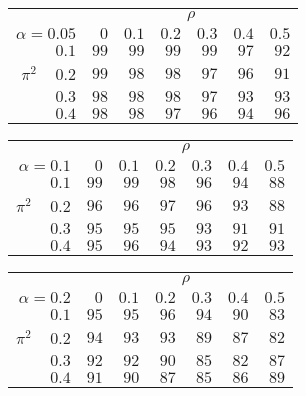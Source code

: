 \begin{tabular}{r|rrrrrr}
\hline\hline
 &\multicolumn{6}{c}{$\rho$} \\ 
 $\alpha = 0.05$ & $0$ & $0.1$ & $0.2$ & $0.3$ & $0.4$ & $0.5$ \\ 
 \hline$0.1$ & $99$ & $99$ & $99$ & $99$ & $97$ & $92$\\ 
$\pi^2\;\;\;$ $0.2$ & $99$ & $98$ & $98$ & $97$ & $96$ & $91$\\ 
$0.3$ & $98$ & $98$ & $98$ & $97$ & $93$ & $93$\\ 
$0.4$ & $98$ & $98$ & $97$ & $96$ & $94$ & $96$\\ 
 \hline 
 \end{tabular}
 
 \vspace{2em} 
 
\begin{tabular}{r|rrrrrr}
\hline\hline
 &\multicolumn{6}{c}{$\rho$} \\ 
 $\alpha = 0.1$ & $0$ & $0.1$ & $0.2$ & $0.3$ & $0.4$ & $0.5$ \\ 
 \hline$0.1$ & $99$ & $99$ & $98$ & $96$ & $94$ & $88$\\ 
$\pi^2\;\;\;$ $0.2$ & $96$ & $96$ & $97$ & $96$ & $93$ & $88$\\ 
$0.3$ & $95$ & $95$ & $95$ & $93$ & $91$ & $91$\\ 
$0.4$ & $95$ & $96$ & $94$ & $93$ & $92$ & $93$\\ 
 \hline 
 \end{tabular}
 
 \vspace{2em} 
 
\begin{tabular}{r|rrrrrr}
\hline\hline
 &\multicolumn{6}{c}{$\rho$} \\ 
 $\alpha = 0.2$ & $0$ & $0.1$ & $0.2$ & $0.3$ & $0.4$ & $0.5$ \\ 
 \hline$0.1$ & $95$ & $95$ & $96$ & $94$ & $90$ & $83$\\ 
$\pi^2\;\;\;$ $0.2$ & $94$ & $93$ & $93$ & $89$ & $87$ & $82$\\ 
$0.3$ & $92$ & $92$ & $90$ & $85$ & $82$ & $87$\\ 
$0.4$ & $91$ & $90$ & $87$ & $85$ & $86$ & $89$\\ 
 \hline 
 \end{tabular}